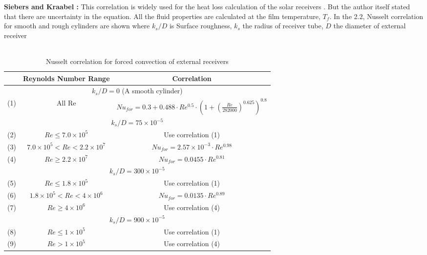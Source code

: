 \textbf{{Siebers and Kraabel \cite{Siebers.1984}:}}
This correlation is widely used for the heat loss calculation of the solar receivers \cite{Christian.2012}. But the author itself stated that there are  uncertainty in the equation. All the fluid properties are calculated at the film temperature, $T_f$. In the \tablename{ 2.2}, Nusselt correlation for smooth and rough cylinders are shown where $k_s/D$ is Surface roughness, $k_s$ the radius of receiver tube, $D$ the diameter of external receiver\\\\
\begin{table}[h]
	\centering
	\begin{tabularx}{\textwidth}{|c|c|c|}
		\hline
		& Reynolds Number Range & Correlation\\
		\hline
		\multicolumn{3}{|c|}{$k_s/D=0$ (A smooth cylinder)} \\
		\hline
		(1) & All Re & $Nu_{for}=0.3+0.488\cdot Re^{0.5}\cdot \left(1+\left(\frac{Re}{282000}\right)^{0.625}\right)^{0.8}$\\
		\hline
		\multicolumn{3}{|c|}{$k_s/D=75\times10^{-5}$} \\
		\hline
		(2) & $Re\le 7.0\times10^5$ & Use correlation (1) \\
		\hline
		(3) & $7.0\times10^5<Re<2.2\times10^7$ & $Nu_{for}=2.57\times10^{-3}\cdot Re^{0.98}$ \\
		\hline
		(4) & $Re\ge2.2\times10^7$ & $Nu_{for}=0.0455\cdot Re^{0.81}$ \\
		\hline
		\multicolumn{3}{|c|}{$k_s/D=300\times10^{-5}$} \\
		\hline
		(5) & $Re\le 1.8\times10^5$ & Use correlation (1) \\
		\hline
		(6) & $1.8\times10^5<Re<4\times10^6$ & $Nu_{for}=0.0135\cdot Re^{0.89}$ \\
		\hline
		(7) & $Re\ge4\times10^6$ & Use correlation (4) \\
		\hline
		\multicolumn{3}{|c|}{$k_s/D=900\times10^{-5}$} \\
		\hline
		(8) & $Re\le 1\times10^5 $ & Use correlation (1) \\
		\hline
		(9) & $Re>1\times10^5$ & Use correlation (4) \\
		\hline
	\end{tabularx}
	\caption{Nusselt correlation for forced convection of external receivers \cite{Siebers.1984}}
\end{table} 
